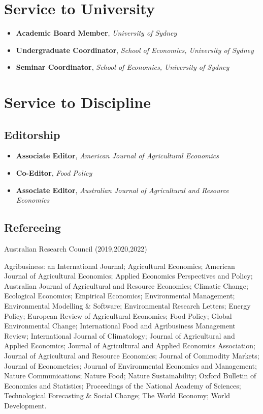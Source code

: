 \documentclass[10pt]{article}
\begin{document}
	\bigskip
	
	\section*{Service to University}
	\begin{itemize}
		\item {} \textbf{Academic Board Member}, \textsl{University of Sydney}
		\item {} \textbf{Undergraduate Coordinator}, \textsl{School of Economics, University of Sydney}
		\item {} \textbf{Seminar Coordinator}, \textsl{School of Economics, University of Sydney}
	\end{itemize}
	
	
	\section*{Service to Discipline}
	
	\subsection*{Editorship}
	\begin{itemize}
		\item {} \textbf{Associate Editor}, \textsl{American Journal of Agricultural Economics}
		\item {} \textbf{Co-Editor}, \textsl{Food Policy}
		\item {} \textbf{Associate Editor}, \textsl{Australian Journal of Agricultural and Resource Economics}
	\end{itemize}
	
	\subsection*{Refereeing}
	Australian Research Council (2019,2020,2022)
	
	\medskip
	
	Agribusiness: an International Journal; Agricultural Economics; American Journal of Agricultural Economics; Applied Economics Perspectives and Policy; Australian Journal of Agricultural and Resource Economics; Climatic Change; Ecological Economics; Empirical Economics; Environmental Management; Environmental Modelling \& Software; Environmental Research Letters; Energy Policy; European Review of Agricultural Economics; Food Policy; Global Environmental Change; International Food and Agribusiness Management Review; International Journal of Climatology; Journal of Agricultural and Applied Economics; Journal of Agricultural and Applied Economics Association; Journal of Agricultural and Resource Economics; Journal of Commodity Markets; Journal of Econometrics; Journal of Environmental Economics and Management; Nature Communications; Nature Food; Nature Sustainability; Oxford Bulletin of Economics and Statistics; Proceedings of the National Academy of Sciences; Technological Forecasting \& Social Change; The World Economy; World Development.
	
\end{document}

